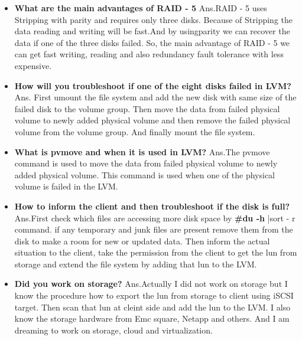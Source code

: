 \begin{enumerate}
\begin{enumerate}
{\begin{itemize}
\begin{itemize}
    \bigskip
    \bigskip

    \item \textbf{What are the main advantages of RAID - 5}
    \newline
    Ans.RAID - 5 uses Stripping with parity and requires only three disks. Because of Stripping the data reading and 	writing will be fast.And by usingparity we can recover the data if one of the three disks failed. So, the main 	advantage of RAID - 5 we can get fast writing, reading and also redundancy fault tolerance with less expensive.

    \bigskip
    \bigskip

    \item \textbf{How will you troubleshoot if one of the eight disks failed in LVM?}
    \newline
    Ans. First umount the file system and add the new disk with same size of the failed disk to the volume group. 	Then move the data from failed physical volume to newly added physical volume and then remove the failed physical volume from the volume group. And finally mount the file system.
 
    \bigskip
    \bigskip

    \item \textbf{What is pvmove and when it is used in LVM?}
    \newline
    Ans.The pvmove command is used to move the data from failed physical volume to newly added physical volume. 	This command is used when one of the physical volume is failed in the LVM.

    \bigskip
    \bigskip

    \item \textbf{How to inform the client and then troubleshoot if the disk is full?}
    \newline
    Ans.First check which files are accessing more disk space by \textbf{#du -h } |sort  - r command. if any temporary and junk files are present remove them from the disk to make a room for new or updated data. Then inform the actual 	situation to the client, take the permission from the client to get the lun from storage and extend the file system 	by adding that lun to the LVM.
    
    \bigskip
    \bigskip

    \item \textbf{Did you work on storage?}
    \newline
    Ans.Actually I did not work on storage but I know the procedure how to export the lun from storage to client using iSCSI target. Then scan that lun at cleint side and add the lun to the LVM. I also know the storage hardware from 	Emc square, Netapp and others. And I am dreaming to work on storage, cloud and virtualization.
    

\end{itemize}
\end{itemize}}
\end{enumerate}
\end{enumerate}
